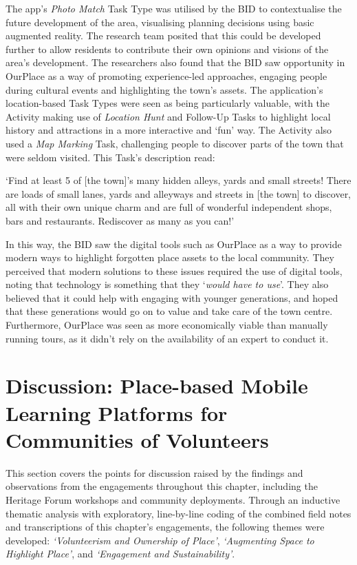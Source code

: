 The app's \textit{Photo Match} Task Type was utilised by the BID to contextualise the future development of the area, visualising planning decisions using basic augmented reality. The research team posited that this could be developed further to allow residents to contribute their own opinions and visions of the area's development. The researchers also found that the BID saw opportunity in OurPlace as a way of promoting experience-led approaches, engaging people during cultural events and highlighting the town's assets. The application's location-based Task Types were seen as being particularly valuable, with the Activity making use of \textit{Location Hunt} and Follow-Up Tasks to highlight local history and attractions in a more interactive and `fun' way. The Activity also used a \textit{Map Marking} Task, challenging people to discover parts of the town that were seldom visited. This Task's description read:

\begin{displayquote}
`Find at least 5 of [the town]'s many hidden alleys, yards and small streets! There are loads of small lanes, yards and alleyways and streets in [the town] to discover, all with their own unique charm and are full of wonderful independent shops, bars and restaurants. Rediscover as many as you can!'
\end{displayquote}

In this way, the BID saw the digital tools such as OurPlace as a way to provide modern ways to highlight forgotten place assets to the local community. They perceived that modern solutions to these issues required the use of digital tools, noting that technology is something that they `\textit{would have to use}'. They also believed that it could help with engaging with younger generations, and hoped that these generations would go on to value and take care of the town centre. Furthermore, OurPlace was seen as more economically viable than manually running tours, as it didn't rely on the availability of an expert to conduct it.

\section{Discussion: Place-based Mobile Learning Platforms for Communities of Volunteers}
\label{sec:CommunityDiscussion}

This section covers the points for discussion raised by the findings and observations from the engagements throughout this chapter, including the Heritage Forum workshops and community deployments. Through an inductive thematic analysis with exploratory, line-by-line coding of the combined field notes and transcriptions of this chapter's engagements, the following themes were developed: \textit{`Volunteerism and Ownership of Place'}, \textit{`Augmenting Space to Highlight Place'}, and \textit{`Engagement and Sustainability'}.

